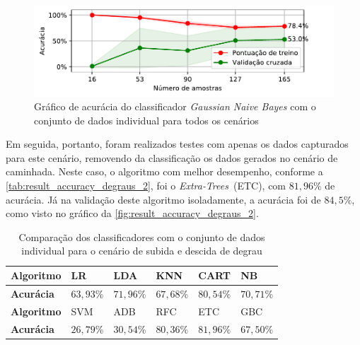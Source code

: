\begin{figure}[ht]
	\caption{\label{fig:result_accuracy_degraus_1}Gráfico de acurácia do classificador \textit{Gaussian Naive Bayes} com o conjunto de dados individual para todos os cenários}
	\begin{center}
		\includegraphics[width=\textwidth]{resources/result_accuracy_degraus_1}
	\end{center}
\end{figure}

\newpage
Em seguida, portanto, foram realizados testes com apenas os dados capturados para este cenário, removendo da classificação os dados gerados no cenário de caminhada. Neste caso, o algoritmo com melhor desempenho, conforme a \autoref{tab:result_accuracy_degraus_2}, foi o \textit{Extra-Trees}~(ETC), com \(81{,}96\%\) de acurácia. Já na validação deste algoritmo isoladamente, a acurácia foi de \(84{,}5\%\), como visto no gráfico da \autoref{fig:result_accuracy_degraus_2}.

\begin{table}[ht]
	\caption{Comparação dos classificadores com o conjunto de dados individual para o cenário de subida e descida de degrau}%
	\label{tab:result_accuracy_degraus_2}
	\begin{tabularx}{\textwidth}{X X X X X X}
		\toprule
		\textbf{Algoritmo} & LR            & LDA           & KNN           & CART          & NB            \\ \midrule
		\textbf{Acurácia}  & \(63{,}93\%\) & \(71{,}96\%\) & \(67{,}68\%\) & \(80{,}54\%\) & \(70{,}71\%\) \\ \bottomrule \toprule
		\textbf{Algoritmo} & SVM           & ADB           & RFC           & ETC           & GBC           \\ \midrule
		\textbf{Acurácia}  & \(26{,}79\%\) & \(30{,}54\%\) & \(80{,}36\%\) & \(81{,}96\%\) & \(67{,}50\%\) \\ \bottomrule
	\end{tabularx}
\end{table}

